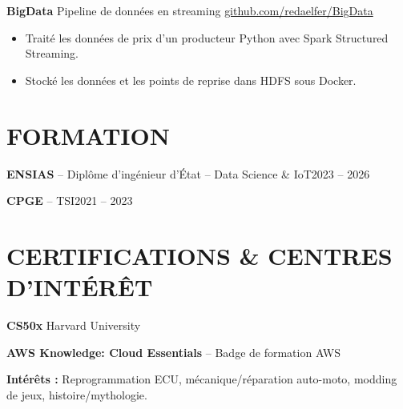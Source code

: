 \documentclass[11pt,a4paper]{article}
\newcommand{\entry}[2]{\noindent #1\hfill #2\par}
\newcommand{\jobgap}{\vspace{5pt}}
\begin{document}
\jobgap
\textbf{BigData} \textbar{} Pipeline de données en streaming \textbar{} \href{https://github.com/redaelfer/BigData}{github.com/redaelfer/BigData}\par
\begin{itemize}
  \item Traité les données de prix d'un producteur Python avec Spark Structured Streaming.
  \item Stocké les données et les points de reprise dans HDFS sous Docker.
\end{itemize}

\section*{FORMATION}
\entry{\textbf{ENSIAS} -- Diplôme d'ingénieur d'État -- Data Science \& IoT}{2023 -- 2026}
\vspace{3pt}
\entry{\textbf{CPGE} -- TSI}{2021 -- 2023}

\section*{CERTIFICATIONS \& CENTRES D'INTÉRÊT}
\textbf{CS50x} \textbar{} Harvard University\par
\vspace{3pt}
\textbf{AWS Knowledge: Cloud Essentials} -- Badge de formation \textbar{} AWS\par

\vspace{5pt}
\textbf{Intérêts :} Reprogrammation ECU, mécanique/réparation auto-moto, modding de jeux, histoire/mythologie.
\end{document}
